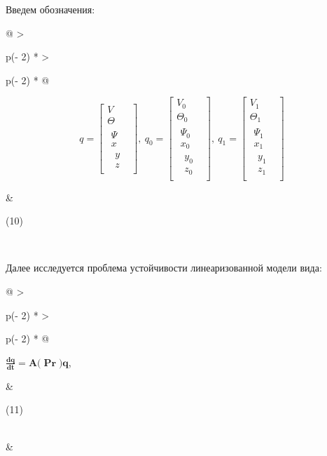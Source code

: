 Введем обозначения:
\begin{longtable}[]{@{}
  >{\raggedright\arraybackslash}p{(\columnwidth - 2\tabcolsep) * }
  >{\raggedright\arraybackslash}p{(\columnwidth - 2\tabcolsep) * }@{}}
\begin{minipage}[b]{\linewidth}\raggedright
\[q = \begin{bmatrix}
V \\
\Theta \\
\begin{matrix}
\Psi \\
x \\
\begin{matrix}
y \\
z
\end{matrix}
\end{matrix}
\end{bmatrix},\ q_{0} = \begin{bmatrix}
V_{0} \\
\Theta_{0} \\
\begin{matrix}
\Psi_{0} \\
x_{0} \\
\begin{matrix}
y_{0} \\
z_{0}
\end{matrix}
\end{matrix}
\end{bmatrix},\ q_{1} = \begin{bmatrix}
V_{1} \\
\Theta_{1} \\
\begin{matrix}
\Psi_{1} \\
x_{1} \\
\begin{matrix}
y_{1} \\
z_{1}
\end{matrix}
\end{matrix}
\end{bmatrix}\]
\end{minipage} & \begin{minipage}[b]{\linewidth}\raggedright
(10)
\end{minipage} \\
\end{longtable}


Далее исследуется проблема устойчивости линеаризованной модели вида:

\begin{longtable}[]{@{}
  >{\raggedright\arraybackslash}p{(\columnwidth - 2\tabcolsep) * }
  >{\raggedright\arraybackslash}p{(\columnwidth - 2\tabcolsep) * }@{}}
\begin{minipage}[b]{\linewidth}\raggedright
\(\frac{\mathbf{dq}}{\mathbf{dt}}\mathbf{= A(}\mathbf{\Pr}\mathbf{)}\mathbf{q}\),
\end{minipage} & \begin{minipage}[b]{\linewidth}\raggedright
(11)
\end{minipage} \\
& \\
\end{longtable}


